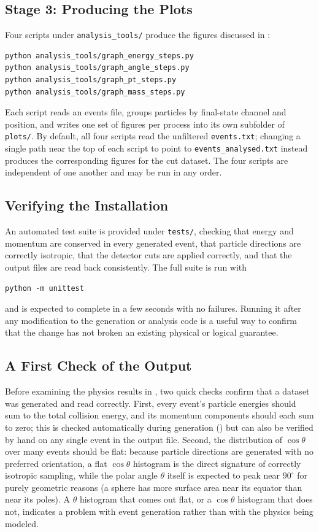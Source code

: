 \documentclass{article}
\begin{document}
\subsection{Stage 3: Producing the Plots}
\label{ssec:running_stage3}
Four scripts under \texttt{analysis\_tools/} produce the figures discussed in :
\begin{verbatim}
python analysis_tools/graph_energy_steps.py
python analysis_tools/graph_angle_steps.py
python analysis_tools/graph_pt_steps.py
python analysis_tools/graph_mass_steps.py
\end{verbatim}
Each script reads an events file, groups particles by final-state channel and position, and writes one set of figures per process into its own subfolder of \texttt{plots/}. By default, all four scripts read the unfiltered \texttt{events.txt}; changing a single path near the top of each script to point to \texttt{events\_analysed.txt} instead produces the corresponding figures for the cut dataset. The four scripts are independent of one another and may be run in any order.

\subsection{Verifying the Installation}
\label{ssec:running_tests}
An automated test suite is provided under \texttt{tests/}, checking that energy and momentum are conserved in every generated event, that particle directions are correctly isotropic, that the detector cuts are applied correctly, and that the output files are read back consistently. The full suite is run with
\begin{verbatim}
python -m unittest
\end{verbatim}
and is expected to complete in a few seconds with no failures. Running it after any modification to the generation or analysis code is a useful way to confirm that the change has not broken an existing physical or logical guarantee.

\subsection{A First Check of the Output}
\label{ssec:first_check}
Before examining the physics results in , two quick checks confirm that a dataset was generated and read correctly. First, every event's particle energies should sum to the total collision energy, and its momentum components should each sum to zero; this is checked automatically during generation () but can also be verified by hand on any single event in the output file. Second, the distribution of $\cos\theta$ over many events should be flat: because particle directions are generated with no preferred orientation, a flat $\cos\theta$ histogram is the direct signature of correctly isotropic sampling, while the polar angle $\theta$ itself is expected to peak near $90^\circ$ for purely geometric reasons (a sphere has more surface area near its equator than near its poles). A $\theta$ histogram that comes out flat, or a $\cos\theta$ histogram that does not, indicates a problem with event generation rather than with the physics being modeled.
\end{document}

